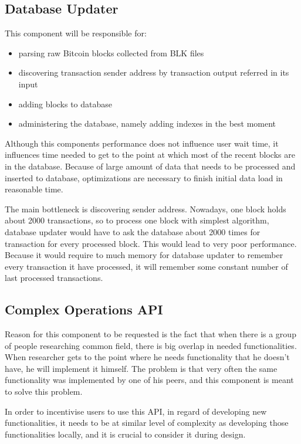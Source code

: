 \documentclass[12pt, en, eng, oneside]{mgr}
\begin{document}
\subsection{Database Updater}
This component will be responsible for:

\begin{itemize}
\item
parsing raw Bitcoin blocks collected from BLK files
\item
discovering transaction sender address by transaction output referred in its input
\item
adding blocks to database
\item
administering the database, namely adding indexes in the best moment
\end{itemize}

Although this components performance does not influence user wait time, it influences time needed to get to the point at which most of the recent blocks are in the database. Because of large amount of data that needs to be processed and inserted to database, optimizations are necessary to finish initial data load in reasonable time.

The main bottleneck is discovering sender address. Nowadays, one block holds about 2000 transactions, so to process one block with simplest algorithm, database updater would have to ask the database about 2000 times for transaction for every processed block. This would lead to very poor performance. Because it would require to much memory for database updater to remember every transaction it have processed, it will remember some constant number of last processed transactions.

\subsection{Complex Operations API}
Reason for this component to be requested is the fact that when there is a group of people researching common field, there is big overlap in needed functionalities. When researcher gets to the point where he needs functionality that he doesn't have, he will implement it himself. The problem is that very often the same functionality was implemented by one of his peers, and this component is meant to solve this problem. 

In order to incentivise users to use this API, in regard of developing new functionalities, it needs to be at similar level of complexity as developing those functionalities locally, and it is crucial to consider it during design.
\end{document}
